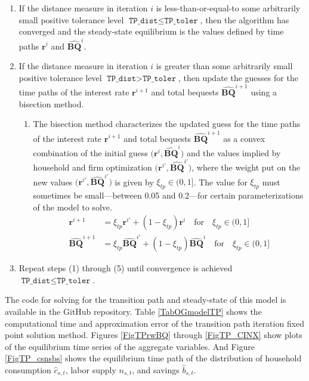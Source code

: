 \documentclass[letterpaper,12pt]{article}
\theoremstyle{definition}
\begin{document}
\begin{enumerate}
\begin{enumerate}
        \item If the distance measure in iteration $i$ is less-than-or-equal-to some arbitrarily small positive tolerance level $\texttt{TP\_dist}\leq\texttt{TP\_toler}$, then the algorithm has converged and the steady-state equilibrium is the values defined by time paths $\bm{r}^i$ and $\bm{\hat{BQ}}^i$.

        \item If the distance measure in iteration $i$ is greater than some arbitrarily small positive tolerance level $\texttt{TP\_dist} > \texttt{TP\_toler}$, then update the guesses for the time paths of the interest rate $\bm{r}^{i+1}$ and total bequests $\bm{\hat{BQ}}^{i+1}$ using a bisection method.
        \begin{enumerate}
          \item The bisection method characterizes the updated guess for the time paths of the interest rate $\bm{r}^{i+1}$ and total bequests $\bm{\hat{BQ}}^{i+1}$ as a convex combination of the initial guess $\bigl(\bm{r}^{i},\bm{\hat{BQ}}^i\bigr)$ and the values implied by household and firm optimization $\bigl(\bm{r}^{i'},\bm{\hat{BQ}}^{i'}\bigr)$, where the weight put on the new values $\bigl(\bm{r}^{i'},\bm{\hat{BQ}}^{i'}\bigr)$ is given by $\xi_{tp}\in(0, 1]$. The value for $\xi_{tp}$ must sometimes be small---between 0.05 and 0.2---for certain parameterizations of the model to solve.
          \begin{align}
            \bm{r}^{i+1} &= \xi_{tp}\bm{r}^{i'} + (1 - \xi_{tp})\bm{r}^{i} \quad\text{for}\quad \xi_{tp}\in(0,1] \label{EqOGmodelUpdate_r_tp} \\
            \bm{\hat{BQ}}^{i+1} &= \xi_{tp}\bm{\hat{BQ}}^{i'} + (1 - \xi_{tp})\bm{\hat{BQ}}^{i} \quad\text{for}\quad \xi_{tp}\in(0,1] \label{EqOGmodelUpdate_BQ_tp}
          \end{align}

        \end{enumerate}

        \item Repeat steps (1) through (5) until convergence is achieved $\texttt{TP\_dist}\leq\texttt{TP\_toler}$.

      \end{enumerate}
    \end{enumerate}

    The code for solving for the transition path and steady-state of this model is available in the GitHub repository. Table \ref{TabOGmodelTP} shows the computational time and approximation error of the transition path iteration fixed point solution method. Figures \ref{FigTPrwBQ} through \ref{FigTP_CINX} show plots of the equilibrium time series of the aggregate variables. And Figure \ref{FigTP_csnsbs} shows the equilibrium time path of the distribution of household consumption $\hat{c}_{s,t}$, labor supply $n_{s,t}$, and savings $\hat{b}_{s,t}$.
\end{document}
